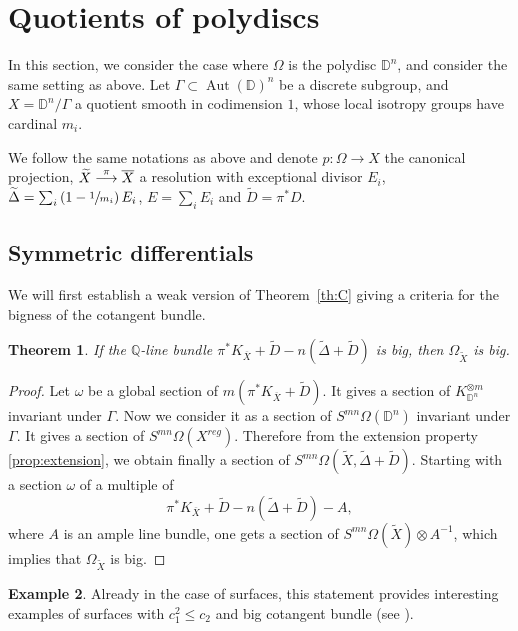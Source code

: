 \documentclass[10pt]{amsart}
\def\To#1{\mathchoice{\xrightarrow{\textstyle\kern4pt#1\kern3pt}}{\stackrel{#1}{\longrightarrow}}{}{}}
\theoremstyle{plain}
\newtheorem{theorem}{Theorem}[section]
\theoremstyle{definition}
\newtheorem{example}[theorem]{Example}
\numberwithin{equation}{theorem}
\DeclareMathOperator{\Aut}{Aut}
\let\wtilde\widetilde
\newcommand\DD{\mathbb D}
\newcommand\QQ{\mathbb Q}
\begin{document}
\section{Quotients of polydiscs}\label{disc}

In this section, we consider the case where $\Omega$ is the polydisc $\DD^n$, and consider the same setting as above. Let $\Gamma \subset \Aut(\DD)^n$ be a discrete subgroup, and $X=\DD^n/\Gamma$ a quotient smooth in codimension $1$, whose local isotropy groups have cardinal $m_i$.

We follow the same notations as above and denote $p : \Omega \to X$ the canonical projection, $\widetilde{X} \To{\pi} \overline{X}$ a resolution with exceptional divisor $E_i$, $\widetilde{\Delta} = \sum_i \left(1 - \sfrac{1}{m_i} \right) E_i$, $E = \sum_i E_i$ and $\widetilde{D} = \pi^\ast D$.

\subsection{Symmetric differentials}
We will first establish a weak version of Theorem~\ref{th:C} giving a criteria for the bigness of the cotangent bundle.

\begin{theorem}\label{big1}
If the $\QQ$-line bundle $\pi^*K_{\overline{X}}+\wtilde{D}-n(\wtilde {\Delta} + \widetilde{D})$ is big, then $\Omega_{\widetilde{X}}$ is big.
\end{theorem}

\begin{proof}
Let $\omega$ be a global section of $m(\pi^*K_{\overline{X}}+\wtilde{D})$. It gives a section of $K_{\DD^n}^{\otimes m}$ invariant under $\Gamma$. Now we consider it as a section of $S^{mn} \Omega (\DD^n)$ invariant under $\Gamma$. It gives a section of $S^{mn} \Omega (X^{reg})$. Therefore from the extension property \ref{prop:extension}, we obtain finally a section of $S^{mn}\Omega(\widetilde{X}, \wtilde{\Delta}+\widetilde{D})$. Starting with a section $\omega$ of a multiple of $$\pi^*K_{\overline{X}}+\wtilde{D}-n(\wtilde {\Delta}+\widetilde{D})-A,$$ where $A$ is an ample line bundle, one gets a section of $S^{mn}\Omega(\widetilde{X})\otimes A^{-1}$, which implies that $\Omega_{\widetilde{X}}$ is big.
\end{proof}

\begin{example}
Already in the case of surfaces, this statement provides interesting examples of surfaces with $c_1^2\leq c_2$ and big cotangent bundle (see \cite{GRR}).
\end{example}
\end{document}
